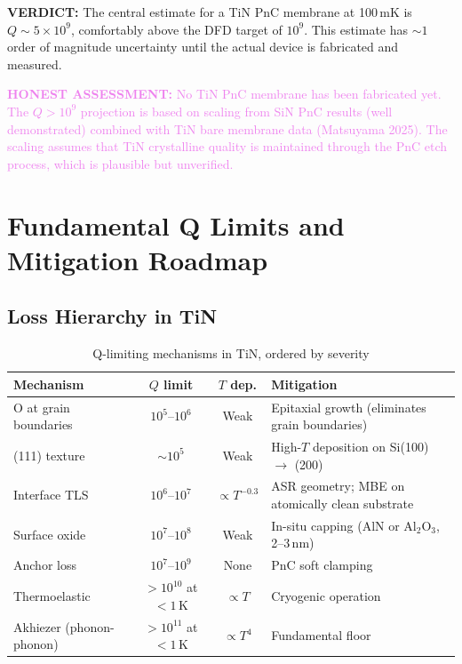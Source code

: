 \documentclass[11pt]{article}
\theoremstyle{remark}
\newcommand{\ee}[1]{\times 10^{#1}}
\newcommand{\honest}[1]{\textcolor{violet}{\textbf{HONEST ASSESSMENT:} #1}}
\newcommand{\verdict}[1]{\textcolor{green!50!black}{\textbf{VERDICT:} #1}}
\begin{document}
\verdict{The central estimate for a TiN PnC membrane at 100\,mK is
$Q \sim 5\ee{9}$, comfortably above the DFD target of $10^9$.
This estimate has $\sim 1$ order of magnitude uncertainty until
the actual device is fabricated and measured.}

\honest{No TiN PnC membrane has been fabricated yet. The $Q > 10^9$
projection is based on scaling from SiN PnC results (well demonstrated)
combined with TiN bare membrane data (Matsuyama 2025). The scaling
assumes that TiN crystalline quality is maintained through the PnC
etch process, which is plausible but unverified.}


\section{Fundamental Q Limits and Mitigation Roadmap}
\label{sec:limits}

\subsection{Loss Hierarchy in TiN}

\begin{table}[H]
\centering
\caption{Q-limiting mechanisms in TiN, ordered by severity}
\begin{tabular}{@{}p{3cm}ccp{4.5cm}@{}}
\toprule
Mechanism & $Q$ limit & $T$ dep. & Mitigation \\
\midrule
O at grain boundaries & $10^5$--$10^6$ & Weak & Epitaxial growth (eliminates
  grain boundaries) \\
(111) texture & $\sim 10^5$ & Weak & High-$T$ deposition on Si(100)
  $\to$ (200) \\
Interface TLS & $10^6$--$10^7$ & $\propto T^{-0.3}$ & ASR geometry; MBE on
  atomically clean substrate \\
Surface oxide & $10^7$--$10^8$ & Weak & In-situ capping (AlN or Al$_2$O$_3$,
  2--3\,nm) \\
Anchor loss & $10^7$--$10^9$ & None & PnC soft clamping \\
Thermoelastic & $> 10^{10}$ at $< 1$\,K & $\propto T$ & Cryogenic operation \\
Akhiezer (phonon-phonon) & $> 10^{11}$ at $< 1$\,K & $\propto T^4$ &
  Fundamental floor \\
\bottomrule
\end{tabular}
\end{table}
\end{document}
